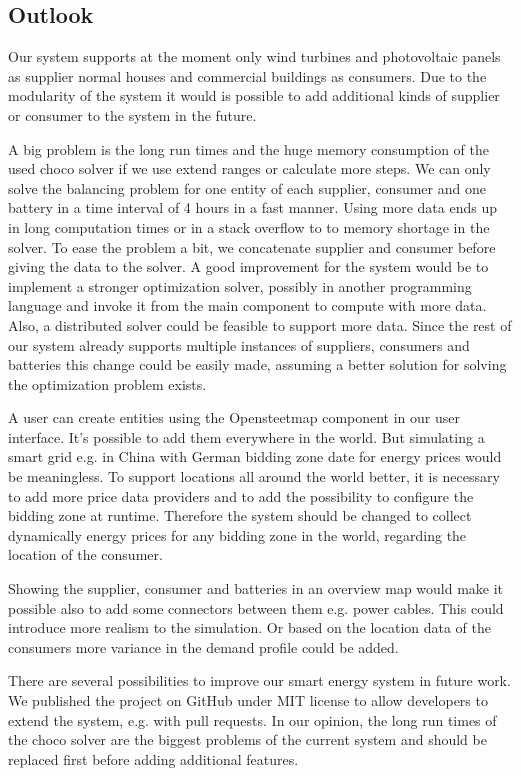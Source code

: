 \subsection{Outlook}
Our system supports at the moment only wind turbines and photovoltaic panels as supplier normal houses and commercial buildings as consumers.
Due to the modularity of the system it would is possible to add additional kinds of supplier or consumer to the system in the future.

A big problem is the long run times and the huge memory consumption of the used choco solver if we use extend ranges or calculate more steps.
We can only solve the balancing problem for one entity of each supplier, consumer and one battery in a time interval of 4 hours in a fast manner.
Using more data ends up in long computation times or in a stack overflow to to memory shortage in the solver.
To ease the problem a bit, we concatenate supplier and consumer before giving the data to the solver.
A good improvement for the system would be to implement a stronger optimization solver, possibly in another programming language and invoke it from the main component to compute with more data. Also, a distributed solver could be feasible to support more data. 
Since the rest of our system already supports multiple instances of suppliers, consumers and batteries this change could be easily made, assuming a better solution for solving the optimization problem exists.

A user can create entities using the Opensteetmap component in our user interface.
It's possible to add them everywhere in the world.
But simulating a smart grid e.g. in China with German bidding zone date for energy prices would be meaningless.
To support locations all around the world better, it is necessary to add more price data providers and to add the possibility to configure the bidding zone at runtime.
Therefore the system should be changed to collect dynamically energy prices for any bidding zone in the world, regarding the location of the consumer.

Showing the supplier, consumer and batteries in an overview map would make it possible also to add some connectors between them e.g. power cables. This could introduce more realism to the simulation. Or based on the location data of the consumers more variance in the demand profile could be added.

There are several possibilities to improve our smart energy system in future work.
We published the project on GitHub under MIT license to allow developers to extend the system, e.g. with pull requests.
In our opinion, the long run times of the choco solver are the biggest problems of the current system and should be replaced first before adding additional features.